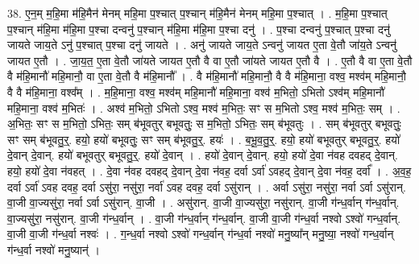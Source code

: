 \documentclass[17pt]{extarticle}
\begin{document}
38. ए॒न॒म् म॒हि॒मा म॑हि॒मैन॑ मेनम् महि॒मा प॒श्चात् प॒श्चान् म॑हि॒मैन॑ मेनम् महि॒मा प॒श्चात् । . म॒हि॒मा प॒श्चात् प॒श्चान् म॑हि॒मा म॑हि॒मा प॒श्चा दन्वनु॑ प॒श्चान् म॑हि॒मा म॑हि॒मा प॒श्चा दनु॑ । . प॒श्चा दन्वनु॑ प॒श्चात् प॒श्चा दनु॑ जायते जाय॒ते ऽनु॑ प॒श्चात् प॒श्चा दनु॑ जायते । . अनु॑ जायते जाय॒ते ऽन्वनु॑ जायत ए॒ता वे॒तौ जा॑य॒ते ऽन्वनु॑ जायत ए॒तौ । . जा॒य॒त॒ ए॒ता वे॒तौ जा॑यते जायत ए॒तौ वै वा ए॒तौ जा॑यते जायत ए॒तौ वै । . ए॒तौ वै वा ए॒ता वे॒तौ वै म॑हि॒मानौ॑ महि॒मानौ॒ वा ए॒ता वे॒तौ वै म॑हि॒मानौ᳚ । . वै म॑हि॒मानौ॑ महि॒मानौ॒ वै वै म॑हि॒माना॒ वश्व॒ मश्व॑म् महि॒मानौ॒ वै वै म॑हि॒माना॒ वश्व᳚म् । . म॒हि॒माना॒ वश्व॒ मश्व॑म् महि॒मानौ॑ महि॒माना॒ वश्व॑ म॒भितो॒ ऽभितो ऽश्व॑म् महि॒मानौ॑ महि॒माना॒ वश्व॑ म॒भितः॑ । . अश्व॑ म॒भितो॒ ऽभितो ऽश्व॒ मश्व॑ म॒भितः॒ सꣳ स म॒भितो ऽश्व॒ मश्व॑ म॒भितः॒ सम् । . अ॒भितः॒ सꣳ स म॒भितो॒ ऽभितः॒ सम् ब॑भूवतुर् बभूवतुः॒ स म॒भितो॒ ऽभितः॒ सम् ब॑भूवतुः । . सम् ब॑भूवतुर् बभूवतुः॒ सꣳ सम् ब॑भूवतु॒र्॒. हयो॒ हयो॑ बभूवतुः॒ सꣳ सम् ब॑भूवतु॒र्॒. हयः॑ । . ब॒भू॒व॒तु॒र्॒. हयो॒ हयो॑ बभूवतुर् बभूवतु॒र्॒. हयो॑ दे॒वान् दे॒वान्. हयो॑ बभूवतुर् बभूवतु॒र्॒. हयो॑ दे॒वान् । . हयो॑ दे॒वान् दे॒वान्. हयो॒ हयो॑ दे॒वा न॑वह दवहद् दे॒वान्. हयो॒ हयो॑ दे॒वा न॑वहत् । . दे॒वा न॑वह दवहद् दे॒वान् दे॒वा न॑वह॒ दर्वा ऽर्वा॑ ऽवहद् दे॒वान् दे॒वा न॑वह॒ दर्वा᳚ । . अ॒व॒ह॒ दर्वा ऽर्वा॑ ऽवह दवह॒ दर्वा ऽसु॑रा॒ नसु॑रा॒ नर्वा॑ ऽवह दवह॒ दर्वा ऽसु॑रान् । . अर्वा ऽसु॑रा॒ नसु॑रा॒ नर्वा ऽर्वा ऽसु॑रान्. वा॒जी वा॒ज्यसु॑रा॒ नर्वा ऽर्वा ऽसु॑रान्. वा॒जी । . असु॑रान्. वा॒जी वा॒ज्यसु॑रा॒ नसु॑रान्. वा॒जी ग॑न्ध॒र्वान् ग॑न्ध॒र्वान्. वा॒ज्यसु॑रा॒ नसु॑रान्. वा॒जी ग॑न्ध॒र्वान् । . वा॒जी ग॑न्ध॒र्वान् ग॑न्ध॒र्वान्. वा॒जी वा॒जी ग॑न्ध॒र्वा नश्वो ऽश्वो॑ गन्ध॒र्वान्. वा॒जी वा॒जी ग॑न्ध॒र्वा नश्वः॑ । . ग॒न्ध॒र्वा नश्वो ऽश्वो॑ गन्ध॒र्वान् ग॑न्ध॒र्वा नश्वो॑ मनु॒ष्या᳚न् मनु॒ष्या॒ नश्वो॑ गन्ध॒र्वान् ग॑न्ध॒र्वा नश्वो॑ मनु॒ष्यान्॑ । \newline
\end{document}
